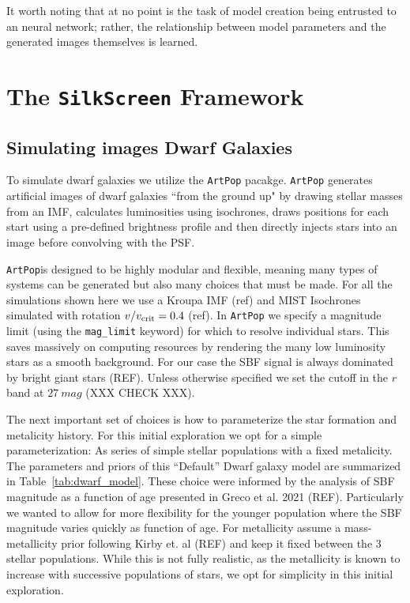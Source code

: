 \documentclass[twocolumn]{aastex631}
\newcommand{\code}[0]{\texttt{SilkScreen}}
\newcommand{\artpop}[0]{\texttt{ArtPop}}
\begin{document}
It worth noting that at no point is the task of model creation being entrusted to an neural network; rather, the relationship between model parameters and the generated images themselves is learned. 

\section{The \code{} Framework}
\subsection{Simulating images Dwarf Galaxies}
\label{sec:sfh}
To simulate dwarf galaxies we utilize the \artpop{} pacakge. \artpop{} generates artificial images of dwarf galaxies ``from the ground up" by drawing stellar masses from an IMF, calculates luminosities using isochrones, draws positions for each start using a pre-defined brightness profile and then directly injects stars into an image before convolving with the PSF.

\artpop is designed to be highly modular and flexible, meaning many types of systems can be generated but also many choices that must be made. For all the simulations shown here we use a Kroupa IMF (ref) and MIST  Isochrones simulated with rotation $v/v_{\rm crit} = 0.4$ (ref). In \artpop{} we specify a magnitude limit (using the \texttt{mag\_limit} keyword) for which to resolve individual stars. This saves massively on computing resources by rendering the many low luminosity stars as a smooth background. For our case the SBF signal is always dominated by bright giant stars (REF).  Unless otherwise specified we set the cutoff in the $r$ band at $27\ mag$ (XXX CHECK XXX).

The next important set of choices is how to parameterize the star formation and metalicity history. For this initial exploration we opt for a simple parameterization: As series of simple stellar populations with a fixed metalicity. The parameters and priors of this ``Default'' Dwarf galaxy model are summarized in Table~\ref{tab:dwarf_model}. These choice were informed by the analysis of SBF magnitude as a function of age presented in Greco et al. 2021 (REF). Particularly we wanted to allow for more flexibility for the younger population where the SBF magnitude varies quickly as function of age. For metallicity assume a mass-metallicity prior following Kirby et. al (REF) and keep it fixed between the 3 stellar populations. While this is not fully realistic, as the metallicity is known to increase with successive populations of stars, we opt for simplicity in this initial exploration.
\end{document}
